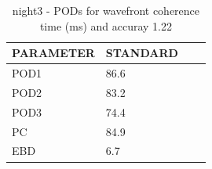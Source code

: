 \begin{table}[p!]
\begin{center}
\begin{tabular}{|l|l|l|l|}
\hline
\multicolumn{1}{|c|}{\cellcolor[HTML]{C0C0C0}\textbf{PARAMETER}} & \multicolumn{1}{c|}{\cellcolor[HTML]{C0C0C0}\textbf{STANDARD}} \\
\hline
\cellcolor[HTML]{C0C0C0}POD1  & 86.6                                \\
\cellcolor[HTML]{C0C0C0}POD2  & 83.2                                \\
\cellcolor[HTML]{C0C0C0}POD3  & 74.4                                \\
\cellcolor[HTML]{C0C0C0}PC    & 84.9                                  \\
\cellcolor[HTML]{C0C0C0}EBD   & 6.7                                 \\
\hline
\end{tabular}
\caption{night3 - PODs for wavefront coherence time (ms) and accuray 1.22}
\label{tab:podtau1.22:night3}
\end{center}
\end{table}
